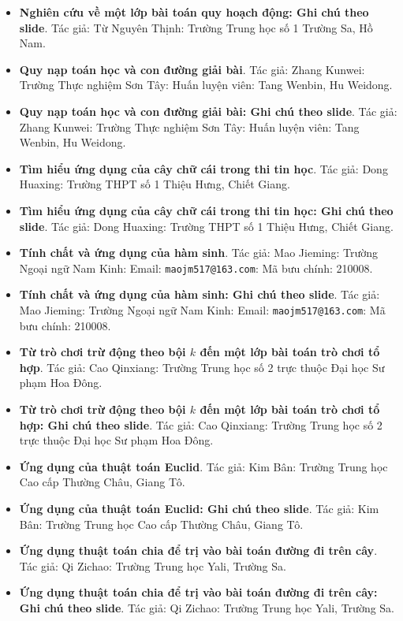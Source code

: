 \documentclass[11pt]{article}
\begin{document}
\begin{itemize}[leftmargin=2em]
  \item \textbf{Nghiên cứu về một lớp bài toán quy hoạch động: Ghi chú theo slide}. Tác giả: Từ Nguyên Thịnh: Trường Trung học số 1 Trường Sa, Hồ Nam.
  \item \textbf{Quy nạp toán học và con đường giải bài}. Tác giả: Zhang Kunwei: Trường Thực nghiệm Sơn Tây: Huấn luyện viên: Tang Wenbin, Hu Weidong.
  \item \textbf{Quy nạp toán học và con đường giải bài: Ghi chú theo slide}. Tác giả: Zhang Kunwei: Trường Thực nghiệm Sơn Tây: Huấn luyện viên: Tang Wenbin, Hu Weidong.
  \item \textbf{Tìm hiểu ứng dụng của cây chữ cái trong thi tin học}. Tác giả: Dong Huaxing: Trường THPT số 1 Thiệu Hưng, Chiết Giang.
  \item \textbf{Tìm hiểu ứng dụng của cây chữ cái trong thi tin học: Ghi chú theo slide}. Tác giả: Dong Huaxing: Trường THPT số 1 Thiệu Hưng, Chiết Giang.
  \item \textbf{Tính chất và ứng dụng của hàm sinh}. Tác giả: Mao Jieming: Trường Ngoại ngữ Nam Kinh: Email: \texttt{maojm517@163.com}: Mã bưu chính: 210008.
  \item \textbf{Tính chất và ứng dụng của hàm sinh: Ghi chú theo slide}. Tác giả: Mao Jieming: Trường Ngoại ngữ Nam Kinh: Email: \texttt{maojm517@163.com}: Mã bưu chính: 210008.
  \item \textbf{Từ trò chơi trừ động theo bội \(k\) đến một lớp bài toán trò chơi tổ hợp}. Tác giả: Cao Qinxiang: Trường Trung học số 2 trực thuộc Đại học Sư phạm Hoa Đông.
  \item \textbf{Từ trò chơi trừ động theo bội \(k\) đến một lớp bài toán trò chơi tổ hợp: Ghi chú theo slide}. Tác giả: Cao Qinxiang: Trường Trung học số 2 trực thuộc Đại học Sư phạm Hoa Đông.
  \item \textbf{Ứng dụng của thuật toán Euclid}. Tác giả: Kim Bân: Trường Trung học Cao cấp Thường Châu, Giang Tô.
  \item \textbf{Ứng dụng của thuật toán Euclid: Ghi chú theo slide}. Tác giả: Kim Bân: Trường Trung học Cao cấp Thường Châu, Giang Tô.
  \item \textbf{Ứng dụng thuật toán chia để trị vào bài toán đường đi trên cây}. Tác giả: Qi Zichao: Trường Trung học Yali, Trường Sa.
  \item \textbf{Ứng dụng thuật toán chia để trị vào bài toán đường đi trên cây: Ghi chú theo slide}. Tác giả: Qi Zichao: Trường Trung học Yali, Trường Sa.
\end{itemize}
\end{document}
